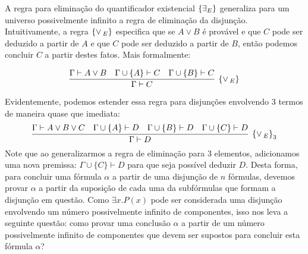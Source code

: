 A regra para eliminação do quantificador existencial $\scriptsize{\{\exists_E}\}$
generaliza para um universo possivelmente infinito a regra de
eliminação da disjunção. Intuitivamente,  a regra $\scriptsize{\{\lor\,_{E}\}}$ especifica
que se $A\lor B$ é provável e que $C$ pode ser deduzido a partir de
$A$ e que $C$ pode ser deduzido a partir de $B$, então podemos
concluir $C$ a partir destes fatos. Mais formalmente:

\[
\infer[\orE]{\Gamma \vdash C}
         {\Gamma \vdash A \lor B & \Gamma \cup \{A\}\vdash C & \Gamma
           \cup \{B\} \vdash C}
\]

Evidentemente, podemos estender essa regra para disjunções envolvendo
$3$ termos de maneira quase que imediata:
\[
\infer[\orE_3]{\Gamma \vdash D}
         {\Gamma \vdash A \lor B \lor C & \Gamma\cup\{A\}\vdash D &
           \Gamma \cup \{B\}\vdash D & \Gamma\cup\{C\}\vdash D}
\]
Note que ao generalizarmos a regra de eliminação para 3 elementos,
adicionamos uma nova premissa: $\Gamma \cup \{C\}\vdash D$ para que
seja possível deduzir $D$. Desta forma, para concluir uma fórmula
$\alpha$ a partir de uma disjunção de $n$ fórmulas, devemos provar
$\alpha$ a partir da suposição de cada uma da subfórmulas que formam a
disjunção em questão. Como $\exists x. P(x)$ pode ser considerada uma
disjunção envolvendo um número possivelmente infinito de componentes,
isso nos leva a seguinte questão: como provar uma conclusão $\alpha$ a
partir de um número possivelmente infinito de componentes que devem
ser supostos para concluir esta fórmula $\alpha$?

